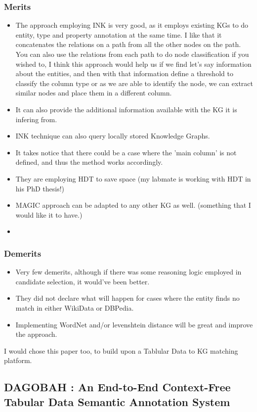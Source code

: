 \documentclass[runningheads]{llncs}
\begin{document}
\subsubsection*{Merits}
\begin{itemize}
    \item The approach employing INK is very good, as it employs existing KGs to do entity, type and property annotation at the same time. I like that it concatenates the relations 
    on a path from all the other nodes on the path. You can also use the relations from each path to do node classification if you wished to, I think this approach would help us if we find let's say
    information about the entities, and then with that information define a threshold to classify the column type or as we are able to identify the node, we can extract similar nodes 
    and place them in a different column.
    \item It can also provide the additional information available with the KG it is infering from.
    \item INK technique can also query locally stored Knowledge Graphs. 
    \item It takes notice that there could be a case where the 'main column' is not defined, and thus the method works accordingly.
    \item They are employing HDT to save space (my labmate is working with HDT in his PhD thesis!)
    \item MAGIC approach can be adapted to any other KG as well. (something that I would like it to have.)
    \item 
\end{itemize}
\subsubsection*{Demerits}
\begin{itemize}
    \item Very few demerits, although if there was some reasoning logic employed in candidate selection, it would've been better.
    \item They did not declare what will happen for cases where the entity finds no match in either WikiData or DBPedia.
    \item Implementing WordNet and/or levenshtein distance will be great and improve the approach.
\end{itemize}
I would chose this paper too, to build upon a Tablular Data to KG matching platform.
\subsection{DAGOBAH : An End-to-End Context-Free Tabular Data Semantic Annotation System}
\end{document}

